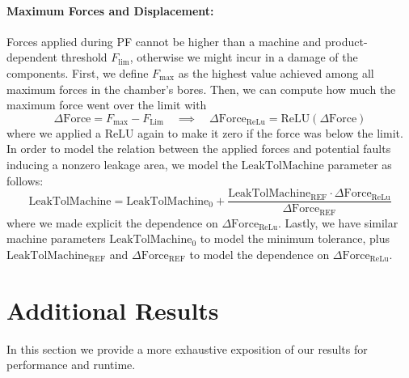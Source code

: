 \paragraph{Maximum Forces and Displacement:}
Forces applied during PF cannot be higher than a machine and product-dependent threshold $F_{\text{lim}}$, otherwise we might incur in a damage of the components. 
First, we define $F_{\text{max}}$ as the highest value achieved among all maximum forces in the chamber's bores.
Then, we can compute how much the maximum force went over the limit with
\begin{equation}
    \Delta \text{Force} = F_{\text{max}} - F_{\text{Lim}} \quad \implies \quad \Delta \text{Force}_{\text{ReLu}} = \text{ReLU}(\Delta \text{Force})
\end{equation}
where we applied a ReLU again to make it zero if the force was below the limit.
In order to model the relation between the applied forces and potential faults inducing a nonzero leakage area, we model the $\text{LeakTolMachine}$ parameter as follows:
\begin{equation}
    \text{LeakTolMachine} = \text{LeakTolMachine}_0 + \frac{\text{LeakTolMachine}_{\text{REF}} \cdot \Delta \text{Force}_{\text{ReLu}}}{\Delta \text{Force}_{\text{REF}}}
\end{equation}
where we made explicit the dependence on $\Delta \text{Force}_{\text{ReLu}}$. Lastly, we have similar machine parameters $\text{LeakTolMachine}_0$ to model the minimum tolerance, plus $\text{LeakTolMachine}_{\text{REF}}$ and $\Delta \text{Force}_{\text{REF}}$ to model the dependence on $\Delta \text{Force}_{\text{ReLu}}$.


\section{Additional Results} \label{sec:appendix_additional_results}

In this section we provide a more exhaustive exposition of our results for performance and runtime.

